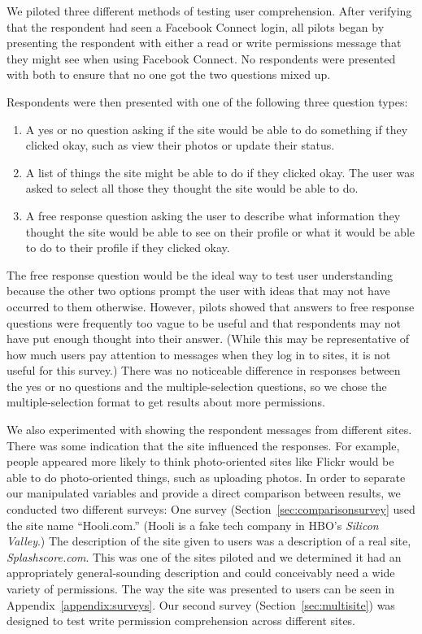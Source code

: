 \documentclass[10pt]{sig-alternate-10pt}
\begin{document}
We piloted three different methods of testing user comprehension. After verifying that the respondent had seen a Facebook Connect login, all pilots began by presenting the respondent with either a read or write permissions message that they might see when using Facebook Connect. No respondents were presented with both to ensure that no one got the two questions mixed up.

Respondents were then presented with one of the following three question types:

\begin{enumerate}  
  \item A yes or no question asking if the site would be able to do something if they clicked okay, such as view their photos or update their status.
  \item A list of things the site might be able to do if they clicked okay. The user was asked to select all those they thought the site would be able to do.
  \item A free response question asking the user to describe what information they thought the site would be able to see on their profile or what it would be able to do to their profile if they clicked okay.
\end{enumerate}

The free response question would be the ideal way to test user understanding because the other two options prompt the user with ideas that may not have occurred to them otherwise. However, pilots showed that answers to free response questions were frequently too vague to be useful and that respondents may not have put enough thought into their answer. (While this may be representative of how much users pay attention to messages when they log in to sites, it is not useful for this survey.) There was no noticeable difference in responses between the yes or no questions and the multiple-selection questions, so we chose the multiple-selection format to get results about more permissions.

We also experimented with showing the respondent messages from different sites. There was some indication that the site influenced the responses. For example, people appeared more likely to think photo-oriented sites like Flickr would be able to do photo-oriented things, such as uploading photos. In order to separate our manipulated variables and provide a direct comparison between results, we conducted two different surveys: One survey (Section~\ref{sec:comparisonsurvey} used the site name ``Hooli.com.'' (Hooli is a fake tech company in HBO's \emph{Silicon Valley}.) The description of the site given to users was a description of a real site, \emph{Splashscore.com}. This was one of the sites piloted and we determined it had an appropriately general-sounding description and could conceivably need a wide variety of permissions. The way the site was presented to users can be seen in Appendix~\ref{appendix:surveys}. Our second survey (Section~\ref{sec:multisite}) was designed to test write permission comprehension across different sites.
\end{document}
